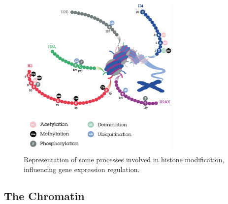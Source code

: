 \begin{figure}[h]
\centering
\includegraphics[width=8cm, keepaspectratio]{img/intro/hm.png}
\caption[Histon modification]{Representation of some processes involved in histone modification, influencing gene expression regulation.}
\label{fig:histmod}
\end{figure}

\subsection{The Chromatin}
\label{sec:chromatin}
